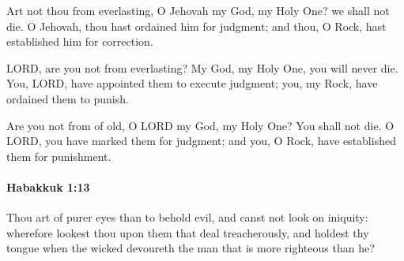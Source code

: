 			\begin{versebox}
					\item[BHS] 
					\item[LXX] 
					\item[ASV] Art not thou from everlasting, O Jehovah my God, my Holy One? we shall not die. O Jehovah, thou hast ordained him for judgment; and thou, O Rock, hast established him for correction.
					\item[NIV] LORD, are you not from everlasting? My God, my Holy One, you will never die. You, LORD, have appointed them to execute judgment; you, my Rock, have ordained them to punish.
					\item[NRSV] Are you not from of old, O LORD my God, my Holy One? You shall not die. O LORD, you have marked them for judgment; and you, O Rock, have established them for punishment.
			\end{versebox}

		\paragraph{Habakkuk 1:13} %
			\label{HABAKKUK-1-13}

			Thou art of purer eyes than to behold evil, and canst not look on iniquity: wherefore lookest thou upon them that deal treacherously, and holdest thy tongue when the wicked devoureth the man that is more righteous than he?

